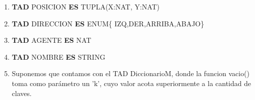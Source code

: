 \documentclass[a4paper,spanish, 10pt]{article}
\begin{document}
\pagestyle{fancy}
\thispagestyle{fancy}
\addtolength{\headheight}{1pt}
\cfoot{\thepage /\pageref{LastPage}}
\renewcommand{\footrulewidth}{0.4pt}

\author{Algoritmos y Estructuras de Datos II, DC, UBA.}
\date{}
\title{}





 	\begin{enumerate}
 	    \item \textbf{TAD} POSICION \textbf{ES} TUPLA(X:NAT, Y:NAT)
	    \item \textbf{TAD} DIRECCION \textbf{ES} ENUM\{ IZQ,DER,ARRIBA,ABAJO\}
	    \item \textbf{TAD} AGENTE \textbf{ES} NAT
	    \item \textbf{TAD} NOMBRE \textbf{ES} STRING
	    \item Suponemos que contamos con el TAD DiccionarioM, donde la funcion vacio() toma como par\'ametro un 'k', cuyo valor acota superiormente a la cantidad de claves.
	\end{enumerate}





\end{document}
